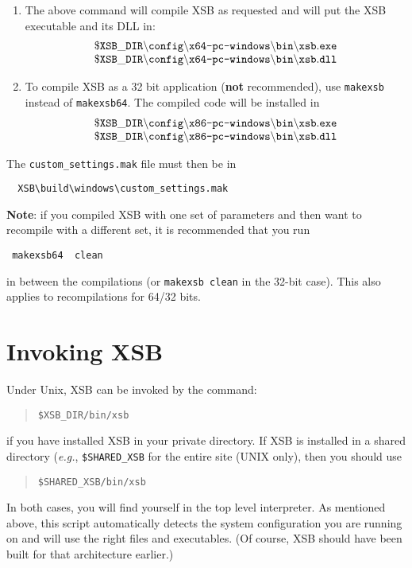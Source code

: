 \begin{enumerate}
 \item The above command will compile XSB as requested and will put the XSB 
   executable and its DLL in:
\[
\begin{array}{l}
 \tt
 \$XSB\_DIR\backslash{}config\backslash\texttt{x64-pc-windows}\backslash{}bin\backslash{}xsb.exe
\\
 \tt
 \$XSB\_DIR\backslash{}config\backslash\texttt{x64-pc-windows}\backslash{}bin\backslash{}xsb.dll
 \end{array}
\]

\item To compile XSB as a 32 bit application (\textbf{not} recommended),
  use \texttt{makexsb} instead of
  \texttt{makexsb64}. The compiled code will be installed   in
\[
\begin{array}{l}
 \tt
 \$XSB\_DIR\backslash{}config\backslash\texttt{x86-pc-windows}\backslash{}bin\backslash{}xsb.exe
\\
 \tt
 \$XSB\_DIR\backslash{}config\backslash\texttt{x86-pc-windows}\backslash{}bin\backslash{}xsb.dll
 \end{array}
\]
\end{enumerate}
The \texttt{custom\_settings.mak} file must then be in
\begin{verbatim}
  XSB\build\windows\custom_settings.mak  
\end{verbatim}

\noindent
{\bf Note}: if you compiled XSB with one set of parameters and then want to
recompile with a different set, it is recommended that you run
\begin{verbatim}
 makexsb64  clean  
\end{verbatim}
in between the compilations (or \texttt{makexsb clean} in the 32-bit
case).  
This also applies to recompilations for 64/32 bits.


\section{Invoking XSB}

Under Unix, XSB can be invoked by the command:
\begin{quote}
       \tt \$XSB\_DIR/bin/xsb
\end{quote}
if you have installed XSB in your private directory.  If XSB is
installed in a shared directory ({\it e.g.}, {\tt \$SHARED\_XSB} for
the entire site (UNIX only), then you should use
\begin{quote}
       \tt \$SHARED\_XSB/bin/xsb
\end{quote}
In both cases, you will find yourself in the top level interpreter.  
As mentioned above, this script automatically detects the system
configuration you are running on and will use the right files and
executables. (Of course, XSB should have been built for that architecture
earlier.)

